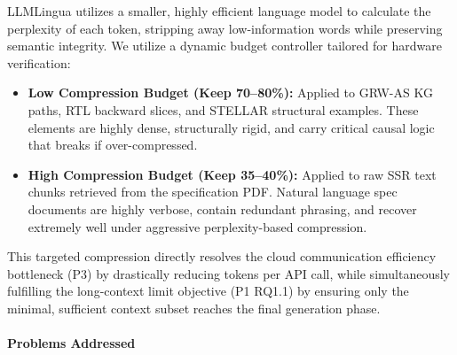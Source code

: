 \documentclass[12pt,a4paper]{article}
\begin{document}
LLMLingua utilizes a smaller, highly efficient language model to calculate the perplexity of each token, stripping away low-information words while preserving semantic integrity. We utilize a dynamic budget controller tailored for hardware verification:

\begin{itemize}[leftmargin=*, noitemsep]
  \item \textbf{Low Compression Budget (Keep 70--80\%):} Applied to GRW-AS KG paths, RTL backward slices, and STELLAR structural examples. These elements are highly dense, structurally rigid, and carry critical causal logic that breaks if over-compressed.
  \item \textbf{High Compression Budget (Keep 35--40\%):} Applied to raw SSR text chunks retrieved from the specification PDF. Natural language spec documents are highly verbose, contain redundant phrasing, and recover extremely well under aggressive perplexity-based compression.
\end{itemize}

This targeted compression directly resolves the cloud communication efficiency bottleneck (P3) by drastically reducing tokens per API call, while simultaneously fulfilling the long-context limit objective (P1 RQ1.1) by ensuring only the minimal, sufficient context subset reaches the final generation phase.

\paragraph{Problems Addressed}
\end{document}
